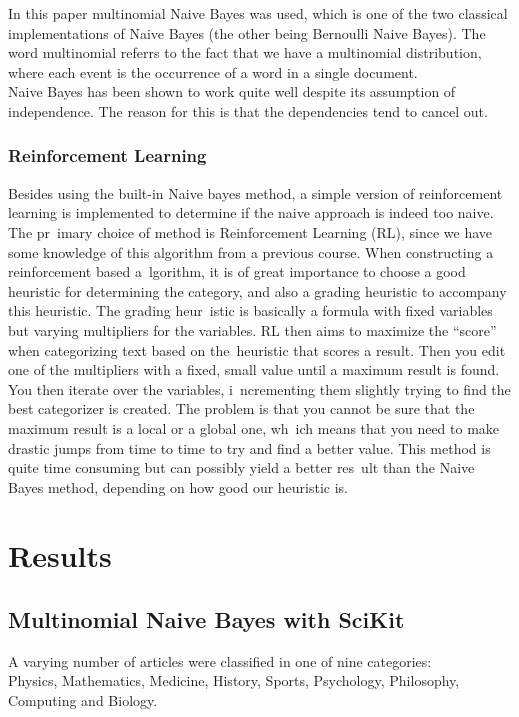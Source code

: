\documentclass[a4paper]{article}
\begin{document}
\noindent In this paper multinomial Naive Bayes was used, which is one of the two classical implementations of Naive Bayes (the other being Bernoulli Naive Bayes). The word multinomial referrs to the fact that we have a multinomial distribution, where each event is the occurrence of a word in a single document.\\

\noindent Naive Bayes has been shown to work quite well despite its assumption of independence. The reason for this is that the dependencies tend to cancel out\cite{NBindependence}. 

\subsubsection{Reinforcement Learning}
Besides using the built-in Naive bayes method, a simple version of reinforcement learning is implemented to determine if the naive approach is indeed too naive. The pr\
imary choice of method is Reinforcement Learning (RL), since we have some knowledge of this algorithm from a previous course. When constructing a reinforcement based a\
lgorithm, it is of great importance to choose a good heuristic for determining the category, and also a grading heuristic to accompany this heuristic. The grading heur\
istic is basically a formula with fixed variables but varying multipliers for the variables. RL then aims to maximize the ``score'' when categorizing text based on the\
 heuristic that scores a result. Then you edit one of the multipliers with a fixed, small value until a maximum result is found. You then iterate over the variables, i\
ncrementing them slightly trying to find the best categorizer is created. The problem is that you cannot be sure that the maximum result is a local or a global one, wh\
ich means that you need to make drastic jumps from time to time to try and find a better value. This method is quite time consuming but can possibly yield a better res\
ult than the Naive Bayes method, depending on how good our heuristic is.

\section{Results}

\subsection{Multinomial Naive Bayes with SciKit}

A varying number of articles were classified in one of nine categories: \\
Physics, Mathematics, Medicine, History, Sports, Psychology, Philosophy, Computing and Biology.\\
\end{document}
